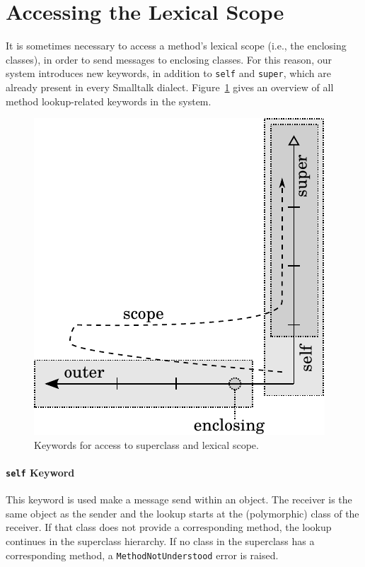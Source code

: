 \section{Accessing the Lexical Scope}
It is sometimes necessary to access a method's lexical scope (i.e., the enclosing classes), in order to send messages to enclosing classes. For this reason, our system introduces new keywords, in addition to \texttt{self} and \texttt{super}, which are already present in every Smalltalk dialect. Figure~\ref{fig:concept_keywords} gives an overview of all method lookup-related keywords in the system.

\begin{figure}
	\centering
	\includegraphics[scale=1]{lookup_keywords.pdf}
	\caption{Keywords for access to superclass and lexical scope.}
	\label{fig:concept_keywords}
\end{figure}

\paragraph{\texttt{self} Keyword}
This keyword is used make a message send within an object. The receiver is the same object as the sender and the lookup starts at the (polymorphic) class of the receiver. If that class does not provide a corresponding method, the lookup continues in the superclass hierarchy. If no class in the superclass has a corresponding method, a \texttt{MethodNotUnderstood} error is raised.


